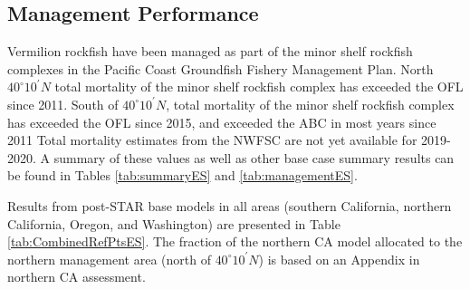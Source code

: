 \documentclass[11pt,
  english,
  a4paper,
]{article}
\begin{document}
\FloatBarrier


\hypertarget{management-performance}{%
\subsection*{Management Performance}\label{management-performance}}

\leavevmode\tagmcend\tagstructend

Vermilion rockfish have been managed as part of the minor shelf rockfish complexes in the Pacific Coast Groundfish Fishery Management Plan. North $40^\circ 10^\prime N$  total mortality of the minor shelf rockfish complex has exceeded the OFL since 2011. South of $40^\circ 10^\prime N$, total mortality of the minor shelf rockfish complex has exceeded the OFL since 2015, and exceeded the ABC in most years since 2011 Total mortality estimates from the NWFSC are not yet available for 2019-2020. A summary of these values as well as other base case summary results can be found in Tables \ref{tab:summaryES} and \ref{tab:managementES}.

Results from post-STAR base models in all areas (southern California, northern California, Oregon, and Washington) are presented in Table \ref{tab:CombinedRefPtsES}. The fraction of the northern CA model allocated to the northern management area (north of $40^\circ 10^\prime N$) is based on an Appendix in northern CA assessment.
\end{document}

